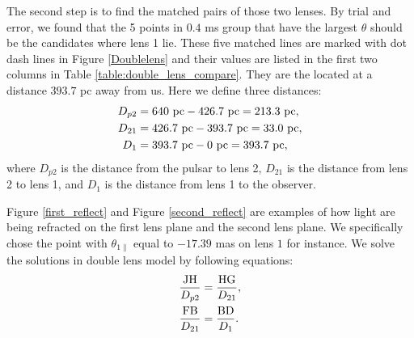 \documentclass[useAMS,usenatbib]{mn2e}
\begin{document}
The second step is to find the matched pairs of those two lenses. By trial and error, we found that the 5 points in $0.4$ ms group that have the largest $\theta$ should be the candidates where lens 1 lie.  These five matched lines are marked with dot dash lines in Figure \ref{Doublelens} and their values are listed in the first two columns in Table \ref{table:double_lens_compare}. They are the located at a distance $393.7$ pc away from us. Here we define three distances:
\begin{equation}
\begin{aligned}
D_{p2}&=640~{\rm pc}-426.7~{\rm pc} =213.3~{\rm pc},\\
D_{21}&=426.7~{\rm pc}-393.7~{\rm pc} =33.0~{\rm pc},\\
D_{1}&=393.7~{\rm pc}- 0~{\rm pc} = 393.7~{\rm pc}, 
\end{aligned} 
\end{equation}
where $D_{p2}$ is the distance from the pulsar to lens 2, $D_{21}$ is the distance from lens 2 to lens 1, and $D_{1}$ is the distance from lens 1 to the observer.

Figure \ref{first_reflect} and Figure \ref{second_reflect} are examples of how light are being refracted on the first lens plane and the second lens plane. We specifically chose the point with $\theta_{1\parallel}$ equal to $-17.39$ mas on lens $1$ for instance. We solve the solutions in double lens model by following equations:
\begin{equation}
\begin{aligned}
\frac{\rm JH}{D_{p2}}&=\frac{\rm HG}{D_{21}},\\
\frac{\rm FB}{D_{21}}&=\frac{\rm BD}{D_{1}}.
\end{aligned}
\end{equation}
\end{document}
